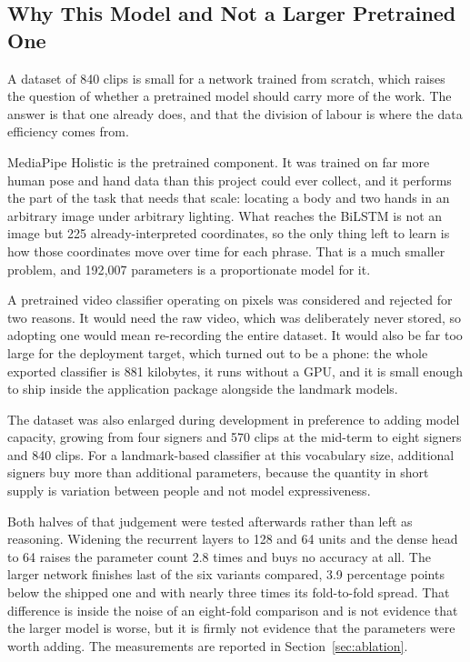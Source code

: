 \subsection{Why This Model and Not a Larger Pretrained One}

A dataset of 840 clips is small for a network trained from scratch, which raises the
question of whether a pretrained model should carry more of the work. The answer is that
one already does, and that the division of labour is where the data efficiency comes from.

MediaPipe Holistic is the pretrained component. It was trained on far more human pose and
hand data than this project could ever collect, and it performs the part of the task that
needs that scale: locating a body and two hands in an arbitrary image under arbitrary
lighting. What reaches the BiLSTM is not an image but 225 already-interpreted coordinates,
so the only thing left to learn is how those coordinates move over time for each phrase.
That is a much smaller problem, and 192{,}007 parameters is a proportionate model for it.

A pretrained video classifier operating on pixels was considered and rejected for two
reasons. It would need the raw video, which was deliberately never stored, so adopting one
would mean re-recording the entire dataset. It would also be far too large for the
deployment target, which turned out to be a phone: the whole exported classifier is
881 kilobytes, it runs without a GPU, and it is small enough to ship inside the
application package alongside the landmark models.

The dataset was also enlarged during development in preference to adding model capacity,
growing from four signers and 570 clips at the mid-term to eight signers and 840 clips.
For a landmark-based classifier at this vocabulary size, additional signers buy more than
additional parameters, because the quantity in short supply is variation between people and
not model expressiveness.

Both halves of that judgement were tested afterwards rather than left as reasoning.
Widening the recurrent layers to 128 and 64 units and the dense head to 64 raises the
parameter count 2.8 times and buys no accuracy at all. The larger network finishes last of
the six variants compared, 3.9 percentage points below the shipped one and with nearly three
times its fold-to-fold spread. That difference is inside the noise of an eight-fold
comparison and is not evidence that the larger model is worse, but it is firmly not evidence
that the parameters were worth adding. The measurements are reported in
Section~\ref{sec:ablation}.

